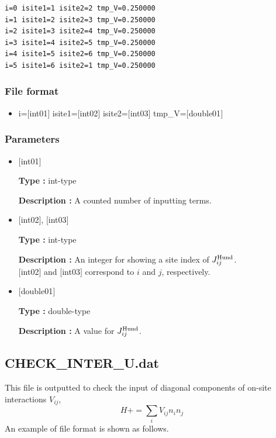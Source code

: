 \begin{minipage}{12.5cm}
\begin{screen}
\begin{verbatim}
i=0 isite1=1 isite2=2 tmp_V=0.250000 
i=1 isite1=2 isite2=3 tmp_V=0.250000 
i=2 isite1=3 isite2=4 tmp_V=0.250000 
i=3 isite1=4 isite2=5 tmp_V=0.250000 
i=4 isite1=5 isite2=6 tmp_V=0.250000 
i=5 isite1=6 isite2=1 tmp_V=0.250000 
\end{verbatim}
\end{screen}
\end{minipage}

\subsubsection{File format}
 \begin{itemize}
   \item  i=$[$int01$]$ isite1=$[$int02$]$ isite2=$[$int03$]$ tmp\_V=$[$double01$]$ 
 \end{itemize}
 
\subsubsection{Parameters}
 \begin{itemize}

    \item  $[$int01$]$ 
   
    {\bf Type :} int-type

   {\bf Description :} A counted number of inputting terms. 
      
   \item  $[$int02$]$, $[$int03$]$
   
    {\bf Type :} int-type

    {\bf Description :}  An integer for showing a site index of $J_{ij}^{\rm Hund}$. \\
    $[$int02$]$ and $[$int03$]$ correspond to $i$ and $j$, respectively.
 
   \item  $[$double01$]$ 
   
    {\bf Type :} double-type

   {\bf Description :} A value for $J_{ij}^{\rm Hund}$.
\end{itemize}

\newpage
\subsection{CHECK\_INTER\_U.dat}
This file is outputted to check the input of diagonal components of on-site interactions $V_{ij}$,
\begin{equation}
H+=\sum_{i} V_{ij} n_{i} n_{j}
\end{equation}
An example of file format is shown as follows.

